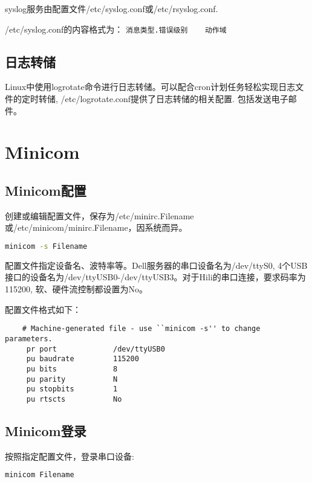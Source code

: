 syslog服务由配置文件/etc/syslog.conf或/etc/rsyslog.conf.

/etc/syslog.conf的内容格式为：
\verb+消息类型.错误级别    动作域+

\subsection{日志转储}
Linux中使用logrotate命令进行日志转储。可以配合cron计划任务轻松实现日志文件的定时转储, /etc/logrotate.conf提供了日志转储的相关配置.
包括发送电子邮件。















\section{Minicom}

\subsection{Minicom配置}

创建或编辑配置文件，保存为/etc/minirc.Filename或/etc/minicom/minirc.Filename，因系统而异。
\begin{lstlisting}[language=bash]
minicom -s Filename
\end{lstlisting}
配置文件指定设备名、波特率等。Dell服务器的串口设备名为/dev/ttyS0, 4个USB接口的设备名为/dev/ttyUSB0-/dev/ttyUSB3。对于Hili的串口连接，要求码率为115200, 软、硬件流控制都设置为No。

配置文件格式如下：
\begin{lstlisting}
    # Machine-generated file - use ``minicom -s'' to change parameters. 
     pr port             /dev/ttyUSB0 
     pu baudrate         115200 
     pu bits             8 
     pu parity           N 
     pu stopbits         1 
     pu rtscts           No
\end{lstlisting}

\subsection{Minicom登录}
按照指定配置文件，登录串口设备:
\begin{lstlisting}[language=bash]
minicom Filename
\end{lstlisting}

